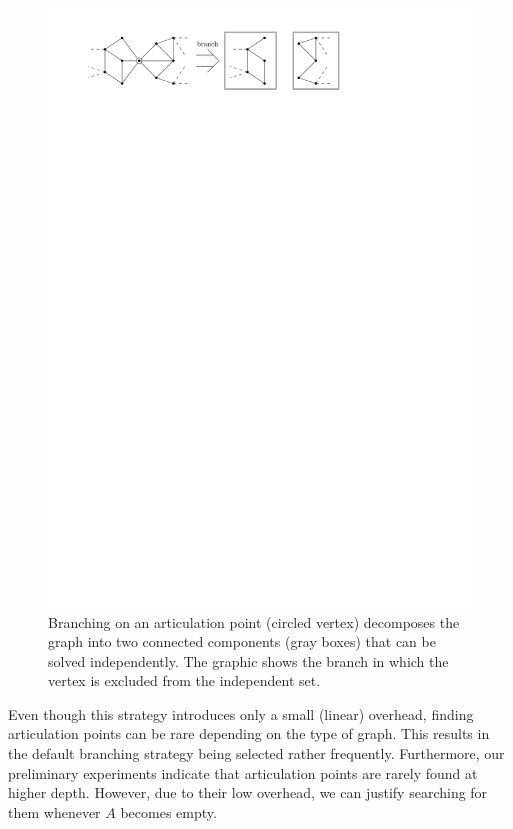 \documentclass[a4paper,UKenglish,cleveref, autoref, thm-restate]{lipics-v2021}
\begin{document}
\begin{figure}[t]
  \centering
  \includegraphics[scale=1]{figures/articulation_points}
  \caption{Branching on an articulation point (circled vertex)
    decomposes the graph into two connected components (gray boxes) that can be
    solved independently. The graphic shows the branch in which the vertex is
    excluded from the independent set.}\label{fig:articulation_points}
\end{figure}

Even though this strategy introduces only a small (linear) overhead, finding articulation points can be rare depending on the type of graph.
This results in the default branching strategy being selected rather
frequently.
Furthermore, our preliminary experiments indicate that articulation points are rarely found at higher depth.
However, due to their low overhead, we can justify searching for them whenever
$A$ becomes empty.
\end{document}

